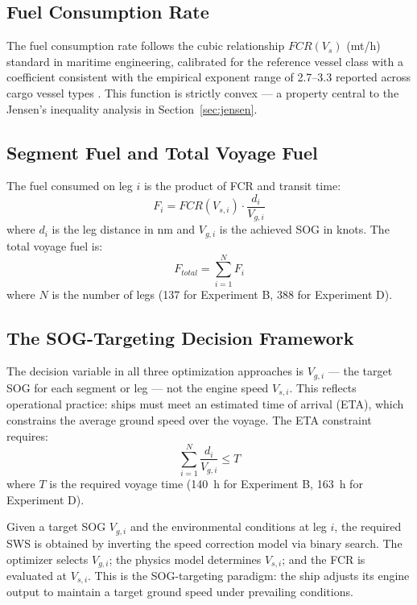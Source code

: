 \documentclass[review]{elsarticle}
\begin{document}
\subsection{Fuel Consumption Rate}
\label{sec:fcr}

The fuel consumption rate follows the cubic relationship $FCR(V_s)$ (mt/h) standard in maritime engineering, calibrated for the reference vessel class with a coefficient consistent with the empirical exponent range of 2.7--3.3 reported across cargo vessel types \cite{Psaraftis2013,Psaraftis2023,Taskar2020}. This function is strictly convex --- a property central to the Jensen's inequality analysis in Section~\ref{sec:jensen}.

\subsection{Segment Fuel and Total Voyage Fuel}
\label{sec:fuel-total}

The fuel consumed on leg $i$ is the product of FCR and transit time:
\begin{equation}
    F_i = FCR(V_{s,i}) \cdot \frac{d_i}{V_{g,i}}
    \label{eq:leg-fuel}
\end{equation}
where $d_i$ is the leg distance in nm and $V_{g,i}$ is the achieved SOG in knots. The total voyage fuel is:
\begin{equation}
    F_{total} = \sum_{i=1}^{N} F_i
    \label{eq:total-fuel}
\end{equation}
where $N$ is the number of legs (137 for Experiment B, 388 for Experiment D).

\subsection{The SOG-Targeting Decision Framework}
\label{sec:sog-framework}

The decision variable in all three optimization approaches is $V_{g,i}$ --- the target SOG for each segment or leg --- not the engine speed $V_{s,i}$. This reflects operational practice: ships must meet an estimated time of arrival (ETA), which constrains the average ground speed over the voyage. The ETA constraint requires:
\begin{equation}
    \sum_{i=1}^{N} \frac{d_i}{V_{g,i}} \leq T
    \label{eq:eta}
\end{equation}
where $T$ is the required voyage time (140~h for Experiment B, 163~h for Experiment D).

Given a target SOG $V_{g,i}$ and the environmental conditions at leg $i$, the required SWS is obtained by inverting the speed correction model via binary search. The optimizer selects $V_{g,i}$; the physics model determines $V_{s,i}$; and the FCR is evaluated at $V_{s,i}$. This is the SOG-targeting paradigm: the ship adjusts its engine output to maintain a target ground speed under prevailing conditions.
\end{document}
